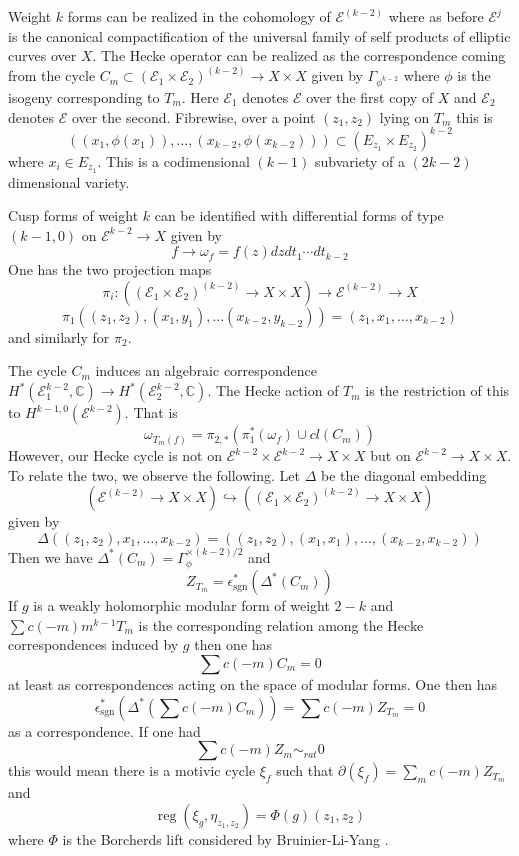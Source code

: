 \documentclass[11pt,a4paper]{article}
\newcommand {\E}{{\mathcal E}}
\newcommand {\C}{{\mathds C}}
\def\sgn{\operatorname{sgn}}
\def\reg{\operatorname{reg}}
\newcommand {\es}{{\epsilon^*_{\sgn}}}
\begin{document}
Weight $k$ forms can be realized in the cohomology of $\E^{(k-2)}$ where as before $\E^j$ is the canonical compactification of the universal family of self products of elliptic curves over $X$. The Hecke operator can be realized as the correspondence coming from the cycle $C_m \subset (\E_1 \times \E_2)^{(k-2)} \rightarrow X \times X$ given by $\Gamma_{\phi^{k-2}}$ where $\phi$ is the isogeny corresponding to $T_m$.  Here $\E_1$ denotes $\E$ over the first copy of $X$ and $\E_2$ denotes $\E$ over the second. Fibrewise, over a point $(z_1,z_2)$ lying on $T_m$ this is 
%
$$((x_1,\phi(x_1)),\dots, (x_{k-2},\phi(x_{k-2}))) \subset (E_{z_1}\times E_{z_2})^{k-2}$$
%
where $x_i \in E_{z_1}$. This is a codimensional $(k-1)$ subvariety of a $(2k-2)$ dimensional variety. 

Cusp forms of weight $k$ can be identified with differential forms of type $(k-1,0)$ on $\E^{k-2} \rightarrow X$ given by 
%
$$ f \rightarrow \omega_f=f(z)dzdt_1\cdots dt_{k-2}$$
%
One has the two projection maps 
%
$$\pi_i:((\E_1 \times \E_2)^{(k-2)} \rightarrow X \times X) \longrightarrow  \E^{(k-2)} \rightarrow X$$
%
$$\pi_1((z_1,z_2),(x_1,y_1),\dots (x_{k-2},y_{k-2}))=(z_1,x_1,\dots,x_{k-2})$$
%
and similarly for $\pi_2$. 

The cycle $C_m$ induces an algebraic correspondence $H^*(\E_1^{k-2},\C) \rightarrow H^*(\E_2^{k-2},\C)$. The Hecke action of $T_m$  is the restriction of this to  $H^{k-1,0}(\E^{k-2})$. That is 
%
$$ \omega_{T_m(f)} = \pi_{2,*}( \pi_1^*(\omega_f) \cup cl(C_m))$$ 
%
However, our Hecke cycle is not on $\E^{k-2} \times \E^{k-2}\rightarrow X \times X $ but on $\E^{k-2} \rightarrow X \times X$. To relate the two, we observe the following. Let $\Delta$ be the diagonal embedding  
%
$$(\E^{(k-2)} \rightarrow X 
\times X)  \hookrightarrow ((\E_1 \times \E_2)^{(k-2)} \rightarrow X \times X)$$
%
given by 
%
$$\Delta((z_1,z_2),x_1,\dots,x_{k-2})=((z_1,z_2),(x_1,x_1),\dots,(x_{k-2},x_{k-2}))$$
%
Then we have $\Delta^*(C_m)=\Gamma_{\phi}^{\times (k-2)/2}$ and 
%
$$Z_{T_m}=\es(\Delta^*(C_m))$$
%
If $g$ is a weakly holomorphic modular form of weight $2-k$ and $\sum c(-m)m^{k-1}T_m$ is the corresponding relation among the Hecke correspondences induced by $g$ then one has 
%
$$\sum c(-m) C_m=0$$
%
at least as correspondences acting on the space of modular forms. One then has 
%
$$\es(\Delta^*(\sum c(-m)C_m))=\sum c(-m)Z_{T_m}=0$$
%
as a correspondence. If one had 
%
$$\sum c(-m)Z_m\sim_{rat} 0$$
% 
this would mean there is a motivic cycle $\xi_f$ such that $\partial(\xi_f)=\sum_m c(-m)Z_{T_m}$ and 
%
$$\reg(\xi_g,\eta_{z_1,z_2})=\Phi(g)(z_1,z_2)$$
%
where $\Phi$ is the Borcherds lift considered by Bruinier-Li-Yang \cite{BLY}. 
\end{document}
